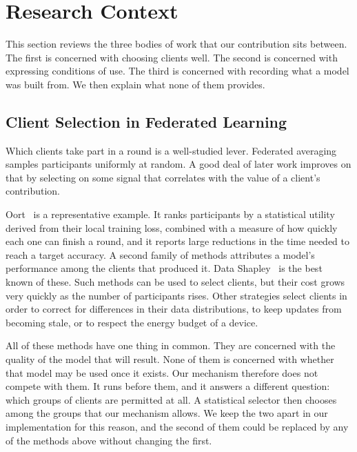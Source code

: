 \documentclass[10pt,conference]{IEEEtran}
\begin{document}
\section{Research Context}
\label{sec:related}

This section reviews the three bodies of work that our contribution sits
between. The first is concerned with choosing clients well. The second is
concerned with expressing conditions of use. The third is concerned with
recording what a model was built from. We then explain what none of them
provides.

\subsection{Client Selection in Federated Learning}

Which clients take part in a round is a well-studied lever. Federated
averaging~\cite{fedavg} samples participants uniformly at random. A good deal
of later work improves on that by selecting on some signal that correlates with
the value of a client's contribution.

Oort~\cite{oort} is a representative example. It ranks participants by a
statistical utility derived from their local training loss, combined with a
measure of how quickly each one can finish a round, and it reports large
reductions in the time needed to reach a target accuracy. A second family of
methods attributes a model's performance among the clients that produced it.
Data Shapley~\cite{datashapley} is the best known of these. Such methods can be
used to select clients, but their cost grows very quickly as the number of
participants rises. Other strategies select clients in order to correct for
differences in their data distributions, to keep updates from becoming stale,
or to respect the energy budget of a device.

All of these methods have one thing in common. They are concerned with the
quality of the model that will result. None of them is concerned with whether
that model may be used once it exists. Our mechanism therefore does not compete
with them. It runs before them, and it answers a different question: which
groups of clients are permitted at all. A statistical selector then chooses
among the groups that our mechanism allows. We keep the two apart in our
implementation for this reason, and the second of them could be replaced by any
of the methods above without changing the first.
\end{document}
